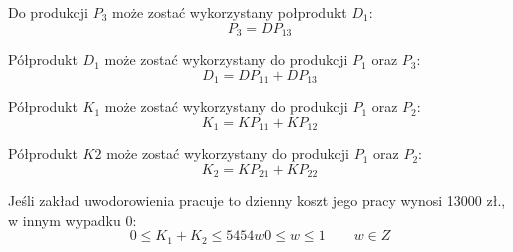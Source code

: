 \documentclass[a4paper,10pt,fleqn]{article}
\begin{document}
		Do produkcji $P_3$ może zostać wykorzystany połprodukt $D_1$:
		\begin{equation}
			P_3 = DP_{13}
		\end{equation}

		Półprodukt $D_1$ może zostać wykorzystany do produkcji $P_1$ oraz $P_3$:
		\begin{equation}
			D_1 = DP_{11} + DP_{13}
		\end{equation}

		Półprodukt $K_1$ może zostać wykorzystany do produkcji $P_1$ oraz $P_2$:
		\begin{equation}
			K_1 = KP_{11} + KP_{12}
		\end{equation}

		Półprodukt $K2$ może zostać wykorzystany do produkcji $P_1$ oraz $P_2$:
		\begin{equation}
			K_2 = KP_{21} + KP_{22}
		\end{equation}

		Jeśli zakład uwodorowienia pracuje to dzienny koszt jego pracy wynosi 13000 zł., w innym wypadku 0:
		\begin{subequations}
			\begin{equation}
				0 \leq K_1 + K_2 \leq 5454w
			\end{equation}
			\begin{equation}
				0 \leq w \leq 1 \qquad w \in Z
			\end{equation}
		\end{subequations}
\end{document}
